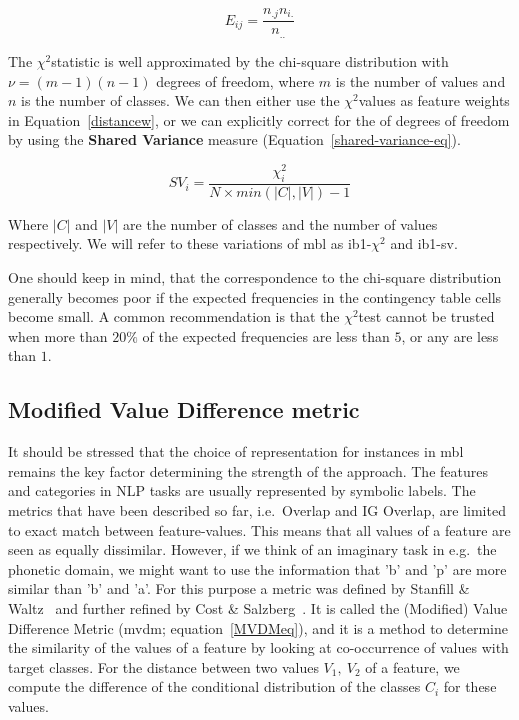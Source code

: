 \documentclass{report}
\newcommand{\chisq}{{$ \chi^2 $}}
\begin{document}
\begin{equation}
E_{ij} = \frac{n_{.j} n_{i.}}{n_{..}}
\label{chisq-expect-eq}
\end{equation}

The \chisq statistic is well approximated by the chi-square
distribution with $\nu = (m-1)(n-1)$ degrees of freedom, where $m$ is
the number of values and $n$ is the number of classes. We can then
either use the \chisq values as feature weights in
Equation~\ref{distancew}, or we can explicitly correct for the of
degrees of freedom by using the {\bf Shared Variance} measure
(Equation~\ref{shared-variance-eq}). 

\begin{equation}
SV_{i} = \frac{ \chi^2_{i}}{N \times min(|C|,|V|)-1}
\label{shared-variance-eq}
\end{equation}

Where $|C|$ and $|V|$ are the number of classes and the number of values
respectively. We will refer to these variations of {\sc mbl} as {\sc
ib1-\chisq} and {\sc ib1-sv}.

One should keep in mind, that the correspondence to the chi-square
distribution generally becomes poor if the expected frequencies in the
contingency table cells become small. A common recommendation is that
the \chisq test cannot be trusted when more than $20\%$ of the
expected frequencies are less than $5$, or any are less than $1$.

\subsection{Modified Value Difference metric}
\label{mvdm}

It should be stressed that the choice of representation for instances
in {\sc mbl} remains the key factor determining the strength of the
approach. The features and categories in NLP tasks are usually
represented by symbolic labels. The metrics that have been described
so far, i.e.~Overlap and IG Overlap, are limited to exact match
between feature-values. This means that all values of a feature are
seen as equally dissimilar. However, if we think of an imaginary task
in e.g.~the phonetic domain, we might want to use the information that
'b' and 'p' are more similar than 'b' and 'a'. For this purpose a
metric was defined by Stanfill \& Waltz~\cite{Stanfill+86} and further
refined by Cost \& Salzberg~\cite{Cost+93}. It is called the
(Modified) Value Difference Metric ({\sc mvdm}; equation~\ref{MVDMeq}), and
it is a method to determine the similarity of the values of a feature
by looking at co-occurrence of values with target classes. For the
distance between two values $V_{1},\ V_{2}$ of a feature, we compute
the difference of the conditional distribution of the classes $C_{i}$
for these values.
\end{document}
